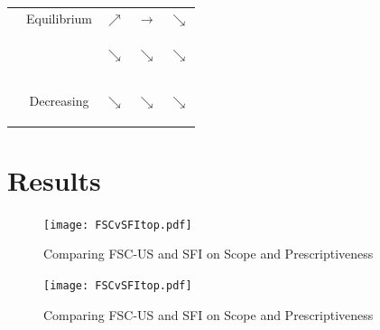 \documentclass[10pt]{beamer}
\begin{document}
\begin{frame}
\begin{table}[h!]
\begin{tabular}{cllll}
\multicolumn{1}{c}{} & \multicolumn{1}{c|}{Equilibrium}   & \multicolumn{1}{c|}{$\nearrow$}           & \multicolumn{1}{c|}{$\longrightarrow$}       & \multicolumn{1}{c|}{$\searrow$}          \\ \cline{3-5} 
\multicolumn{1}{c}{} & \multicolumn{1}{c|}{} & \multicolumn{1}{c|}{$\searrow$}           & \multicolumn{1}{c|}{$\searrow$}       & \multicolumn{1}{c|}{\begin{rotate}{30}$\searrow$\end{rotate}}          \\ 
\multicolumn{1}{c}{} & \multicolumn{1}{c|}{Decreasing} & \multicolumn{1}{c|}{\begin{rotate}{30}$\searrow$\end{rotate}}           & \multicolumn{1}{c|}{$\searrow$}       & \multicolumn{1}{c|}{$\searrow$}          \\ \cline{3-5} 
\end{tabular}
\end{table}
\end{frame}




\section{Results}
\begin{frame}
\begin{figure}[h!]
\centering
\label{sfi}
\caption{Comparing FSC-US and SFI on Scope and Prescriptiveness}
\texttt{[image: FSCvSFItop.pdf]}
\end{figure}
\end{frame}

\begin{frame}
\begin{figure}[h!]
\centering
\label{sfi}
\caption{Comparing FSC-US and SFI on Scope and Prescriptiveness}
\texttt{[image: FSCvSFItop.pdf]}
\end{figure}
\end{frame}
\end{document}
